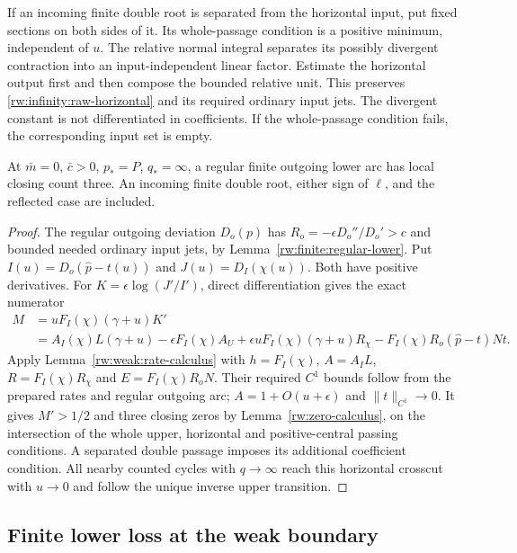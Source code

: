 If an incoming finite double root is separated from the horizontal
input, put fixed sections on both sides of it. Its whole-passage
condition is a positive minimum, independent of $u$. The relative
normal integral separates its possibly divergent contraction into
an input-independent linear factor. Estimate the horizontal output first
and then compose the bounded relative unit. This preserves \eqref{rw:infinity:raw-horizontal}
and its required ordinary input jets. The divergent constant is not
differentiated in coefficients. If the whole-passage condition fails,
the corresponding input set is empty.

\begin{proposition}
\label{rw:infinity:weak-regular}
At $\bar m=0$, $\bar c>0$, $p_*=P$, $q_*=\infty$, a regular
finite outgoing lower arc has local closing count three. An incoming
finite double root, either sign of $\ell$, and the reflected case
are included.
\end{proposition}
\begin{proof}
The regular outgoing deviation $D_o(p)$ has
$R_o=-\epsilon D_o''/D_o'>c$ and bounded needed ordinary input
jets, by Lemma~\ref{rw:finite:regular-lower}. Put
$I(u)=D_o(\widehat p-t(u))$ and $J(u)=D_I(\chi(u))$.
Both have positive derivatives. For $K=\epsilon\log(J'/I')$,
direct differentiation gives the exact numerator
\begin{equation}\label{rw:infinity:weak-regular-numerator}
\begin{aligned}
 M&=uF_I(\chi)(\gamma+u)K'\\
  &=A_I(\chi)L(\gamma+u)-\epsilon F_I(\chi)A_U
    +\epsilon uF_I(\chi)(\gamma+u)R_\chi
    -F_I(\chi)R_o(\widehat p-t)Nt.
\end{aligned}
\end{equation}
Apply Lemma~\ref{rw:weak:rate-calculus} with
$h=F_I(\chi)$, $A=A_I L$, $R=F_I(\chi)R_\chi$ and
$E=F_I(\chi)R_oN$. Their required $C^1$ bounds follow from the
prepared rates and regular outgoing arc; $A=1+O(u+\epsilon)$ and
$\|t\|_{C^1}\to0$. It gives $M'>1/2$ and three closing zeros by
Lemma~\ref{rw:zero-calculus}, on the intersection of the whole upper,
horizontal and positive-central passing conditions. A separated double
passage imposes its additional coefficient condition. All nearby
counted cycles with $q\to\infty$ reach this horizontal crosscut
with $u\to0$ and follow the unique inverse upper transition.
\end{proof}

\subsection{Finite lower loss at the weak boundary}

